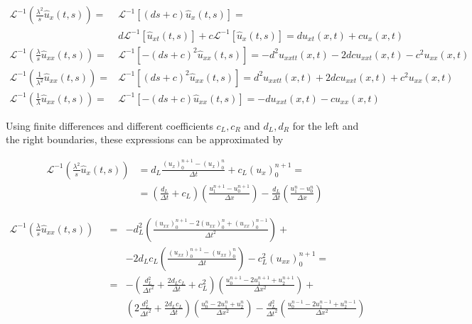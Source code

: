 \begin{equation}
	\begin{aligned}
    \mathcal{L}^{-1} \left( \frac{\lambda^2}{s} \hat{u}_x(t,s) \right) = & \mathcal{L}^{-1} \left[ (ds+c) \hat{u}_x(t,s) \right] = \\
    			 & d\mathcal{L}^{-1} \left[ \hat{u}_{xt}(t,s) \right] + c \mathcal{L}^{-1} \left[ \hat{u}_{x}(t,s) \right] =   du_{xt}(x,t) + cu_x(x,t) \\
    \mathcal{L}^{-1} \left( \frac{\lambda}{s} \hat{u}_{xx}(t,s) \right) = & \mathcal{L}^{-1} \left[ -(ds+c)^2 \hat{u}_{xx}(t,s) \right] =  -d^2u_{xxtt}(x,t) -2dcu_{xxt}(x,t) - c^2u_{xx}(x,t) \\
    \mathcal{L}^{-1} \left( \frac{1}{\lambda^2} \hat{u}_{xx}(t,s) \right) = & \mathcal{L}^{-1} \left[ (ds+c)^2 \hat{u}_{xx}(t,s) \right] =d^2u_{xxtt}(x,t) + 2dcu_{xxt}(x,t) + c^2u_{xx}(x,t) \\
    \mathcal{L}^{-1} \left( \frac{1}{\lambda} \hat{u}_{xx}(t,s) \right) = & \mathcal{L}^{-1} \left[ -(ds+c) \hat{u}_{xx}(t,s) \right] = -du_{xxt}(x,t) - cu_{xx}(x,t)
    \end{aligned}
\end{equation}

\indent Using finite differences and different coefficients $c_L,c_R$ and $d_L,d_R$ for the left and the right boundaries, these expressions can be approximated by

\small

\begin{equation}
    \label{eq:FDorder2A}
    \begin{aligned}
    \mathcal{L}^{-1} \left( \frac{\lambda^2}{s} \hat{u}_x(t,s) \right) & =  d_L \frac{ (u_x)_0^{n+1} - (u_x)_0^n}{\Delta t} + c_L (u_x)_0^{n+1} = \\
    			& =  \left( \frac{d_L}{\Delta t} + c_L \right) \left( \frac{u_1^{n+1} - u_0^{n+1}}{\Delta x}\right) - \frac{d_L}{\Delta t} \left( \frac{u_1^{n} - u_0^{n}}{\Delta x}\right)
    \end{aligned}
 \end{equation}
 
 \begin{equation}
     \label{eq:FDorder2B}
    \begin{aligned}
    \mathcal{L}^{-1} \left( \frac{\lambda}{s} \hat{u}_{xx}(t,s) \right) && = &  -d_L^2 \left( \frac{(u_{xx})_0^{n+1} - 2(u_{xx})_0^{n} + (u_{xx})_0^{n-1}}{\Delta t^2} \right) + \\
    			&&  &  - 2d_Lc_L \left( \frac{(u_{xx})_0^{n+1} - (u_{xx})_0^{n}}{\Delta t} \right) - c_L^2 (u_{xx})_0^{n+1} = \\
    			&&  = & -\left( \frac{d_L^2}{\Delta t^2} + \frac{2d_Lc_L}{\Delta t} + c_L^2  \right) \left(  \frac{u_0^{n+1} - 2u_1^{n+1} + u_2^{n+1}}{\Delta x^2} \right) + \\
    			&& &  \left( 2\frac{d_L^2}{\Delta t^2} + \frac{2d_Lc_L}{\Delta t}\right) \left(  \frac{u_0^{n} - 2u_1^n + u_2^{n}}{\Delta x^2} \right) - \frac{d_L^2}{\Delta t^2} \left(  \frac{u_0^{n-1} - 2u_1^{n-1} + u_2^{n-1}}{\Delta x^2} \right)
    \end{aligned}
 \end{equation}
     			
